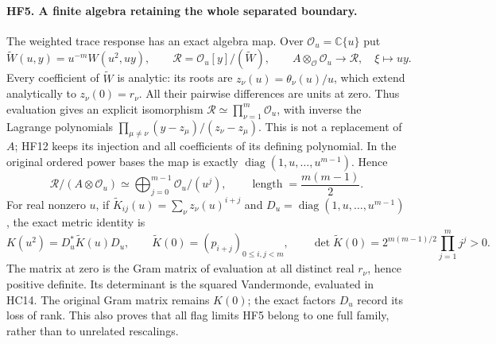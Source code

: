 \paragraph{HF5. A finite algebra retaining the whole separated boundary.}
The weighted trace response has an exact algebra map. Over
$\mathcal O_u=\mathbb C\{u\}$ put
\[
 \widetilde W(u,y)=u^{-m}W(u^2,uy),\qquad
 \mathscr R=\mathcal O_u[y]/(\widetilde W),\qquad
 A\otimes_{\mathcal O}\mathcal O_u\longrightarrow\mathscr R,
       \quad\xi\longmapsto uy.
 \tag{HF12}
\]
Every coefficient of $\widetilde W$ is analytic: its roots are
$z_\nu(u)=\theta_\nu(u)/u$, which extend analytically to
$z_\nu(0)=r_\nu$. All their pairwise differences are units at zero.
Thus evaluation gives an explicit isomorphism
$\mathscr R\simeq\prod_{\nu=1}^m\mathcal O_u$, with inverse
the Lagrange polynomials
$\prod_{\mu\ne\nu}(y-z_\mu)/(z_\nu-z_\mu)$.
This is not a replacement of $A$; HF12 keeps its injection and
all coefficients of its defining polynomial. In the original
ordered power bases the map is exactly
$\operatorname{diag}(1,u,\ldots,u^{m-1})$. Hence
\[
 \mathscr R/(A\otimes\mathcal O_u)
     \simeq\bigoplus_{j=0}^{m-1}\mathcal O_u/(u^j),\qquad
 \operatorname{length}=\frac{m(m-1)}2.
 \tag{HF13}
\]
For real nonzero $u$, if $\widetilde K_{ij}(u)=\sum_\nu z_\nu(u)^{i+j}$
and $D_u=\operatorname{diag}(1,u,\ldots,u^{m-1})$, the exact
metric identity is
\[
 K(u^2)=D_u^*\widetilde K(u)D_u,\qquad
 \widetilde K(0)=(p_{i+j})_{0\le i,j<m},\qquad
 \det\widetilde K(0)=2^{m(m-1)/2}\prod_{j=1}^m j^j>0.
 \tag{HF14}
\]
The matrix at zero is the Gram matrix of evaluation at all
distinct real $r_\nu$, hence positive definite. Its determinant
is the squared Vandermonde, evaluated in HC14. The original
Gram matrix remains $K(0)$; the exact factors $D_u$ record its
loss of rank. This also proves that all flag limits HF5 belong
to one full family, rather than to unrelated rescalings.

